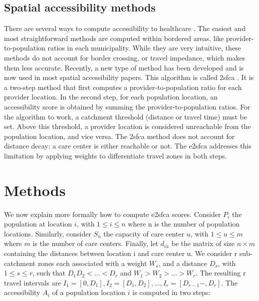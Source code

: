 \subsection{Spatial accessibility methods}

There are several ways to compute accessibility to healthcare \cite{guagliardo_spatial_2004}. The easiest and most straightforward methods are computed within bordered areas, like provider-to-population ratios in each municipality. While they are very intuitive, these methods do not account for border crossing, or travel impedance, which makes them less accurate. Recently, a new type of method has been developed and is now used in most spatial accessibility papers. This algorithm is called \ac{2sfca} \cite{luo_using_2004}. It is a two-step method that first computes a provider-to-population ratio for each provider location. In the second step, for each population location, an accessibility score is obtained by summing the provider-to-population ratios. For the algorithm to work, a catchment threshold (distance or travel time) must be set. Above this threshold, a provider location is considered unreachable from the population location, and vice versa. The \ac{2sfca} method does not account for distance decay: a care center is either reachable or not. The \ac{e2sfca} \cite{luo_enhanced_2009} addresses this limitation by applying weights to differentiate travel zones in both steps.

\section{Methods}

We now explain more formally how to compute \ac{e2sfca} scores. Consider $P_i$ the population at location $i$, with $1 \leq i \leq n$ where n is the number of population locations. Similarly, consider $S_u$ the capacity of care center $u$, with $1 \leq u \leq m$ where $m$ is the number of care centers. Finally, let $d_{iu}$ be the matrix of size $n \times m$ containing the distances between location i and care center u. We consider r sub-catchment zones each associated with a weight $W_s$, and a distance $D_s$, with $1 \leq s \leq r$, such that $D_1 D_2 < ... < D_r$ and $W_1 > W_2 > ... > W_r$. The resulting r travel intervals are $I_1=[0, D_1], I_2=[D_1, D_2 ], ... ,I_r=[D_{r-1}-,D_r]$. The accessibility $A_i$ of a population location $i$ is computed in two steps:

